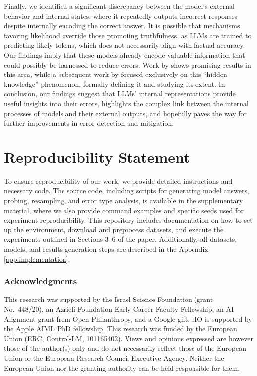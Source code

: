 \documentclass{article} %
\begin{document}
Finally, we identified a significant discrepancy between the model’s external behavior and internal states, where it repeatedly outputs incorrect responses despite internally encoding the correct answer.
It is possible that mechanisms favoring likelihood override those promoting truthfulness, as LLMs are trained to predicting likely tokens, which does not necessarily align with factual accuracy.
Our findings imply that these models already encode valuable information that could possibly be harnessed to reduce errors.
Work by \citet{chuang2024dola} shows promising results in this area, while a subsequent work by \citet{gekhman2025inside} focused exclusively on this ``hidden knowledge'' phenomenon, formally defining it and studying its extent.
In conclusion, our findings suggest that LLMs' internal representations provide useful insights into their errors, highlights the complex link between the internal processes of models and their external outputs, and hopefully paves the way for further improvements in error detection and mitigation.

\section{Reproducibility Statement}

To ensure reproducibility of our work, we provide detailed instructions and necessary code. The source code, including scripts for generating model answers, probing, resampling, and error type analysis, is available in the supplementary material, where we also provide command examples and specific seeds used for experiment reproducibility.
This repository includes documentation on how to set up the environment, download and preprocess datasets, and execute the experiments outlined in Sections 3--6 of the paper. Additionally, all datasets, models, and results generation steps are described in the Appendix \ref{app:implementation}.

\subsubsection*{Acknowledgments}
 This research was supported by the Israel Science
Foundation (grant No.\ 448/20), an Azrieli Foundation
Early Career Faculty Fellowship,  an AI Alignment grant from Open Philanthropy, and a Google gift. HO is supported by the Apple AIML PhD fellowship. 
This research was funded by the European Union (ERC, Control-LM, 101165402). Views and opinions expressed are however those of the author(s) only and do not necessarily reflect those of the European Union or the European Research Council Executive Agency. Neither the European Union nor the granting authority can be held responsible for them.
\end{document}
